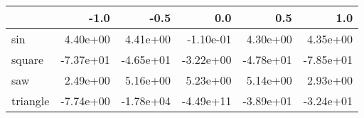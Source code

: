 \begin{tabular}{lrrrrr}
\toprule
{} &      -1.0 &      -0.5 &       0.0 &       0.5 &       1.0 \\
\midrule
sin      &  4.40e+00 &  4.41e+00 & -1.10e-01 &  4.30e+00 &  4.35e+00 \\
square   & -7.37e+01 & -4.65e+01 & -3.22e+00 & -4.78e+01 & -7.85e+01 \\
saw      &  2.49e+00 &  5.16e+00 &  5.23e+00 &  5.14e+00 &  2.93e+00 \\
triangle & -7.74e+00 & -1.78e+04 & -4.49e+11 & -3.89e+01 & -3.24e+01 \\
\bottomrule
\end{tabular}
